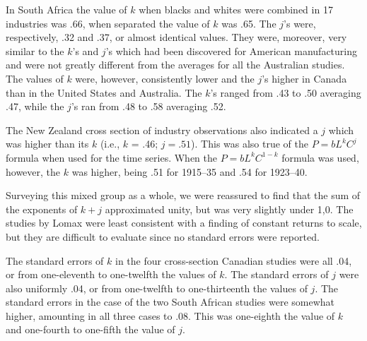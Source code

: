 \documentclass{article}
\begin{document}
In South Africa the value of \(k\) when blacks and whites were combined in 17 industries was .66, when separated the value of \(k\) was .65. The \(j\)'s were, respectively, .32 and .37, or almost identical values. They were, moreover, very similar to the \(k\)'s and \(j\)'s which had been discovered for American manufacturing and were not greatly different from the averages for all the Australian studies. The values of \(k\) were, however, consistently lower and the \(j\)'s higher in Canada than in the United States and Australia. The \(k\)'s ranged from .43 to .50 averaging .47, while the \(j\)'s ran from .48 to .58 averaging .52.

The New Zealand cross section of industry observations also indicated a \(j\) which was higher than its \(k\) (i.e., \(k\) = .46; \(j = .51\)). This was also true of the \(P=bL^kC^j\) formula when used for the time series. When the \(P=bL^kC^{1-k}\) formula was used, however, the \(k\) was higher, being .51 for 1915--35 and .54 for 1923--40.

Surveying this mixed group as a whole, we were reassured to find that the sum of the exponents of \(k + j\) approximated unity, but was very slightly under 1,0. The studies by Lomax were least consistent with a finding of constant returns to scale, but they are difficult to evaluate since no standard errors were reported.

The standard errors of \(k\) in the four cross-section Canadian studies were all .04, or from one-eleventh to one-twelfth the values of \(k\). The standard errors of \(j\) were also uniformly .04, or from one-twelfth to one-thirteenth the values of \(j\). The standard errors in the case of the two South African studies were somewhat higher, amounting in all three cases to .08. This was one-eighth the value of \(k\) and one-fourth to one-fifth the value of \(j\). %
\end{document}

